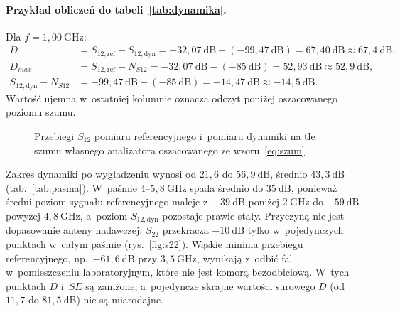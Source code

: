 \documentclass[11pt,a4paper]{article}
\begin{document}
\paragraph{Przykład obliczeń do tabeli~\ref{tab:dynamika}.} Dla $f = 1{,}00\ \mathrm{GHz}$:
\begin{align*}
  D &= S_{12,\mathrm{ref}} - S_{12,\mathrm{dyn}} = -32{,}07\ \mathrm{dB} - (-99{,}47\ \mathrm{dB})
     = 67{,}40\ \mathrm{dB} \approx 67{,}4\ \mathrm{dB},\\
  D_{max} &= S_{12,\mathrm{ref}} - N_{S12} = -32{,}07\ \mathrm{dB} - (-85\ \mathrm{dB})
     = 52{,}93\ \mathrm{dB} \approx 52{,}9\ \mathrm{dB},\\
  S_{12,\mathrm{dyn}} - N_{S12} &= -99{,}47\ \mathrm{dB} - (-85\ \mathrm{dB}) = -14{,}47\ \mathrm{dB}
     \approx -14{,}5\ \mathrm{dB}.
\end{align*}
Wartość ujemna w~ostatniej kolumnie oznacza odczyt poniżej oszacowanego poziomu szumu.

\begin{figure}[H]
  \centering
  \caption{Przebiegi $S_{12}$ pomiaru referencyjnego i~pomiaru dynamiki na tle szumu własnego
           analizatora oszacowanego ze wzoru~\eqref{eq:szum}.}
  \label{fig:poziomy}
\end{figure}

Zakres dynamiki po wygładzeniu wynosi od $21{,}6$ do $56{,}9\ \mathrm{dB}$, średnio
$43{,}3\ \mathrm{dB}$ (tab.~\ref{tab:pasma}). W~paśmie $4$--$5{,}8\ \mathrm{GHz}$ spada średnio do
$35\ \mathrm{dB}$, ponieważ średni poziom sygnału referencyjnego maleje z~$-39\ \mathrm{dB}$
poniżej $2\ \mathrm{GHz}$ do $-59\ \mathrm{dB}$ powyżej $4{,}8\ \mathrm{GHz}$, a~poziom
$S_{12,\mathrm{dyn}}$ pozostaje prawie stały. Przyczyną nie jest dopasowanie anteny
nadawczej: $S_{22}$ przekracza $-10\ \mathrm{dB}$ tylko w~pojedynczych punktach w~całym
paśmie (rys.~\ref{fig:s22}). Wąskie minima
przebiegu referencyjnego, np.\ $-61{,}6\ \mathrm{dB}$ przy $3{,}5\ \mathrm{GHz}$, wynikają
z~odbić fal w~pomieszczeniu laboratoryjnym, które nie jest komorą bezodbiciową. W~tych punktach $D$ i~$SE$ są
zaniżone, a~pojedyncze skrajne wartości surowego $D$ (od $11{,}7$ do $81{,}5\ \mathrm{dB}$)
nie są miarodajne.
\end{document}
